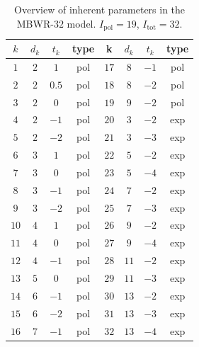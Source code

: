 \documentclass[english]{../thermomemo/thermomemo}
\numberwithin{equation}{section}
\begin{document}
\begin{table}
  \label{MBWR32Terms}
  \centering
  \begin{tabular}{c c c c | c c c c }
    $k$		        & $d_k$		& $t_k$		& type		& k		 & $d_k$	  & $t_k$	    & type	       \\
    \hline
    $1$		        & $2$       	&$ 1$		& pol           & $17$	 & $8$       	  &$-1$		    & pol              \\
    $2$		        & $2$       	&$ 0.5$		&pol            & $18$	 & $8$       	  &$-2$		    & pol              \\
    $3$		        & $2$       	&$ 0$		&pol            & $19$	 & $9$       	  &$-2$		    & pol              \\
    $4$		        & $2$       	&$-1$ 		&pol            & $20$	 & $3$       	  &$-2$		    & exp              \\
    $5$		        & $2$       	&$-2$ 		&pol            & $21$	 & $3$       	  &$-3$		    & exp              \\
    $6$		        & $3$       	&$ 1$		&pol            & $22$	 & $5$       	  &$-2$		    & exp              \\
    $7$		        & $3$       	&$ 0$		&pol            & $23$	 & $5$       	  &$-4$		    & exp              \\
    $8$		        & $3$       	&$-1$		&pol            & $24$	 & $7$       	  &$-2$		    & exp              \\
    $9$		        & $3$       	&$-2$		&pol            & $25$	 & $7$       	  &$-3$		    & exp              \\
    $10$		& $4$       	&$ 1$		&pol            & $26$	 & $9$        	  &$-2$		    & exp              \\
    $11$		& $4$       	&$ 0$		&pol            & $27$   & $9$            &$-4$             & exp              \\
    $12$		& $4$       	&$-1$		&pol            & $28$   & $11$           &$-2$             & exp              \\
    $13$		& $5$       	&$ 0$		&pol            & $29$   & $11$           &$-3$             & exp              \\
    $14$		& $6$       	&$-1$		&pol            & $30$   & $13$           &$-2$             & exp              \\
    $15$		& $6$       	&$-2$		&pol            & $31$   & $13$           &$-3$             & exp              \\
    $16$		& $7$       	&$-1$		&pol            & $32$   & $13$           &$-4$             & exp              
  \end{tabular}
  \caption{Overview of inherent parameters in the MBWR-$32$ model. $I_{\mathrm{pol}}=19$, $I_{\mathrm{tot}}=32$.}
\end{table}
\end{document}
